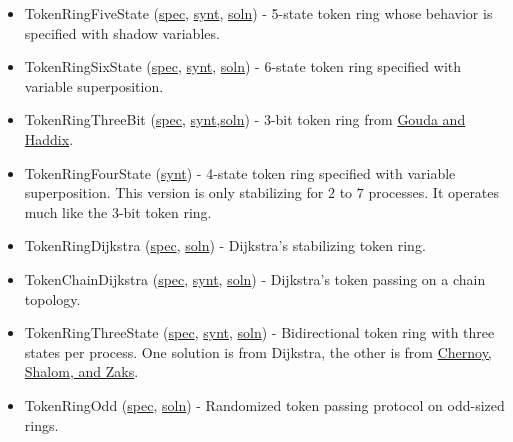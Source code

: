 \begin{itemize}
\item TokenRingFiveState (\href{examplespec/TokenRing.prot}{spec}, \href{examplesynt/TokenRing.prot}{synt}, \href{examplesoln/TokenRingFiveState.prot}{soln})
- 5-state token ring whose behavior is specified with shadow variables.
\item TokenRingSixState (\href{examplespec/TokenRingSuperpos.prot}{spec}, \href{examplesynt/TokenRingSuperpos.prot}{synt}, \href{examplesoln/TokenRingSixState.prot}{soln})
- 6-state token ring specified with variable superposition.
\item TokenRingThreeBit (\href{examplespec/TokenRingThreeBit.prot}{spec}, \href{examplesynt/TokenRingThreeBit.prot}{synt},\href{examplesoln/TokenRingThreeBit.prot}{soln})
- 3-bit token ring from \href{http://dx.doi.org/10.1006/jpdc.1996.0066}{Gouda and Haddix}.
\item TokenRingFourState (\href{examplesynt/TokenRingFourState.prot}{synt})
- 4-state token ring specified with variable superposition.
This version is only stabilizing for $2$ to $7$ processes.
It operates much like the 3-bit token ring.
\item TokenRingDijkstra (\href{examplespec/TokenRingDijkstra.prot}{spec}, \href{examplesoln/TokenRingDijkstra.prot}{soln})
- Dijkstra's stabilizing token ring.
\item TokenChainDijkstra (\href{examplespec/TokenChainDijkstra.prot}{spec}, \href{examplesynt/TokenChainDijkstra.prot}{synt}, \href{examplesoln/TokenChainDijkstra.prot}{soln})
- Dijkstra's token passing on a chain topology.
\item TokenRingThreeState (\href{examplespec/TokenRingThreeState.prot}{spec}, \href{examplesynt/TokenRingThreeState.prot}{synt}, \href{examplesoln/TokenRingThreeState.prot}{soln})
- Bidirectional token ring with three states per process.
One solution is from Dijkstra, the other is from \href{http://citeseerx.ist.psu.edu/viewdoc/summary?doi=10.1.1.153.6017}{Chernoy, Shalom, and Zaks}.
\item TokenRingOdd (\href{examplespec/TokenRingOdd.prot}{spec}, \href{examplesoln/TokenRingOdd.prot}{soln})
- Randomized token passing protocol on odd-sized rings.
\end{itemize}


